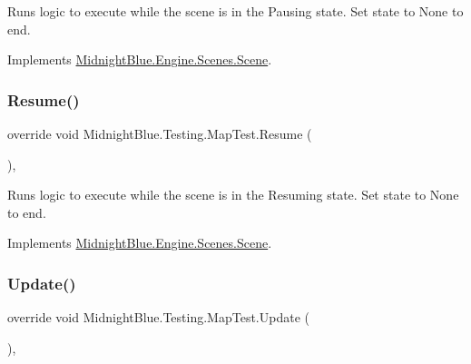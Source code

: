 Runs logic to execute while the scene is in the Pausing state. Set state to None to end. 



Implements \hyperlink{class_midnight_blue_1_1_engine_1_1_scenes_1_1_scene_aeb3c4d9bea0177d21fbffcdabab660de}{Midnight\+Blue.\+Engine.\+Scenes.\+Scene}.

\hypertarget{class_midnight_blue_1_1_testing_1_1_map_test_aa595402e6d3702119877721f7cb3ab9f}{}\label{class_midnight_blue_1_1_testing_1_1_map_test_aa595402e6d3702119877721f7cb3ab9f} 
\subsubsection{\texorpdfstring{Resume()}{Resume()}}
{\footnotesize\ttfamily override void Midnight\+Blue.\+Testing.\+Map\+Test.\+Resume (\begin{DoxyParamCaption}{ }\end{DoxyParamCaption})\hspace{0.3cm}{\ttfamily [inline]}, {\ttfamily [virtual]}}



Runs logic to execute while the scene is in the Resuming state. Set state to None to end. 



Implements \hyperlink{class_midnight_blue_1_1_engine_1_1_scenes_1_1_scene_ab7cd837b20785116007a4732d90bc548}{Midnight\+Blue.\+Engine.\+Scenes.\+Scene}.

\hypertarget{class_midnight_blue_1_1_testing_1_1_map_test_ae4bb817dd9c5b55bd1d818de9f527c7c}{}\label{class_midnight_blue_1_1_testing_1_1_map_test_ae4bb817dd9c5b55bd1d818de9f527c7c} 
\subsubsection{\texorpdfstring{Update()}{Update()}}
{\footnotesize\ttfamily override void Midnight\+Blue.\+Testing.\+Map\+Test.\+Update (\begin{DoxyParamCaption}{ }\end{DoxyParamCaption})\hspace{0.3cm}{\ttfamily [inline]}, {\ttfamily [virtual]}}




